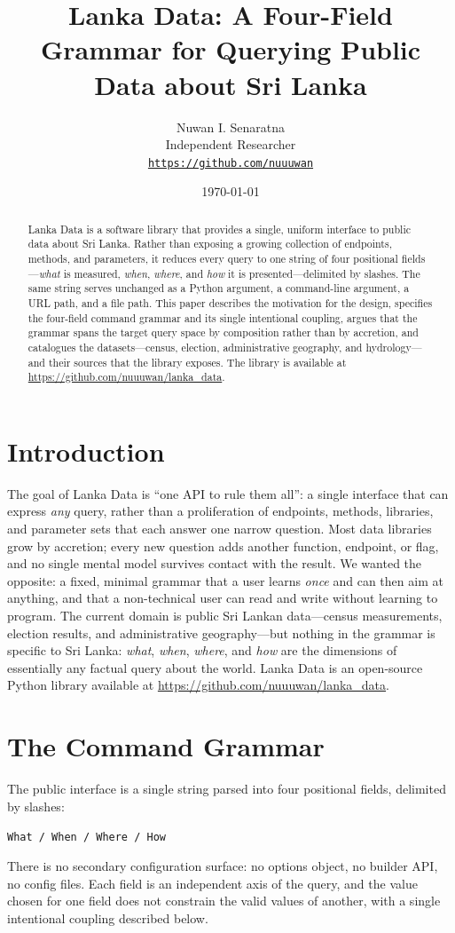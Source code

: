 \documentclass[10pt,a4paper]{article}%
\title{Lanka Data: A Four-Field Grammar for Querying Public Data about Sri Lanka}%
\author{Nuwan I. Senaratna\\Independent Researcher\\\vspace{0.25em}\texttt{\href{https://github.com/nuuuwan}{https://github.com/nuuuwan}}}%
\date{\today}%
\begin{document}
%
\pagestyle{empty}%
\normalsize%
\maketitle%
\begin{abstract}%
Lanka Data is a software library that provides a single, uniform interface to public data about Sri Lanka. Rather than exposing a growing collection of endpoints, methods, and parameters, it reduces every query to one string of four positional fields---\emph{what} is measured, \emph{when}, \emph{where}, and \emph{how} it is presented---delimited by slashes. The same string serves unchanged as a Python argument, a command-line argument, a URL path, and a file path. This paper describes the motivation for the design, specifies the four-field command grammar and its single intentional coupling, argues that the grammar spans the target query space by composition rather than by accretion, and catalogues the datasets---census, election, administrative geography, and hydrology---and their sources that the library exposes. The library is available at \url{https://github.com/nuuuwan/lanka_data}.%
\end{abstract}%
\section{Introduction}%
\label{sec:Introduction}%
The goal of Lanka Data is ``one API to rule them all'': a single interface that can express \emph{any} query, rather than a proliferation of endpoints, methods, libraries, and parameter sets that each answer one narrow question. Most data libraries grow by accretion; every new question adds another function, endpoint, or flag, and no single mental model survives contact with the result. We wanted the opposite: a fixed, minimal grammar that a user learns \emph{once} and can then aim at anything, and that a non-technical user can read and write without learning to program. The current domain is public Sri Lankan data---census measurements, election results, and administrative geography---but nothing in the grammar is specific to Sri Lanka: \emph{what}, \emph{when}, \emph{where}, and \emph{how} are the dimensions of essentially any factual query about the world.%
Lanka Data is an open-source Python library available at \url{https://github.com/nuuuwan/lanka_data}.

%
\section{The Command Grammar}%
\label{sec:TheCommandGrammar}%
The public interface is a single string parsed into four positional fields, delimited by slashes:%
\begin{center}%
\texttt{What / When / Where / How}%
\end{center}%
There is no secondary configuration surface: no options object, no builder API, no config files. Each field is an independent axis of the query, and the value chosen for one field does not constrain the valid values of another, with a single intentional coupling described below.%
\end{document}
